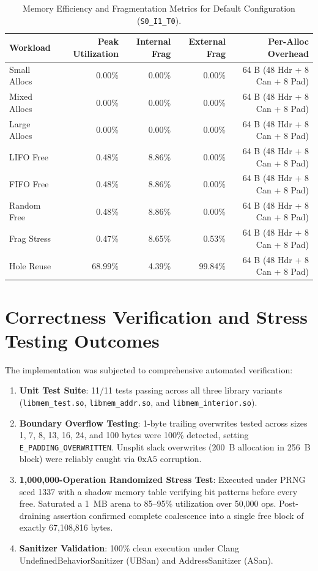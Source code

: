 \documentclass[a4paper,11pt]{report}
\begin{document}
\begin{table}[htbp]
\centering
\caption{Memory Efficiency and Fragmentation Metrics for Default Configuration (\texttt{S0\_I1\_T0}).}
\label{tab:efficiency}
\begin{tabular}{lrrrr}
\toprule
\textbf{Workload} & \textbf{Peak Utilization} & \textbf{Internal Frag} & \textbf{External Frag} & \textbf{Per-Alloc Overhead} \\
\midrule
Small Allocs    & 0.00\%  & 0.00\% & 0.00\%  & 64 B (48 Hdr + 8 Can + 8 Pad) \\
Mixed Allocs    & 0.00\%  & 0.00\% & 0.00\%  & 64 B (48 Hdr + 8 Can + 8 Pad) \\
Large Allocs    & 0.00\%  & 0.00\% & 0.00\%  & 64 B (48 Hdr + 8 Can + 8 Pad) \\
LIFO Free       & 0.48\%  & 8.86\% & 0.00\%  & 64 B (48 Hdr + 8 Can + 8 Pad) \\
FIFO Free       & 0.48\%  & 8.86\% & 0.00\%  & 64 B (48 Hdr + 8 Can + 8 Pad) \\
Random Free     & 0.48\%  & 8.86\% & 0.00\%  & 64 B (48 Hdr + 8 Can + 8 Pad) \\
Frag Stress     & 0.47\%  & 8.65\% & 0.53\%  & 64 B (48 Hdr + 8 Can + 8 Pad) \\
Hole Reuse      & 68.99\% & 4.39\% & 99.84\% & 64 B (48 Hdr + 8 Can + 8 Pad) \\
\bottomrule
\end{tabular}
\end{table}

\section{Correctness Verification and Stress Testing Outcomes}
The implementation was subjected to comprehensive automated verification:
\begin{enumerate}
    \item \textbf{Unit Test Suite}: 11/11 tests passing across all three library variants (\texttt{libmem\_test.so}, \texttt{libmem\_addr.so}, and \texttt{libmem\_interior.so}).
    \item \textbf{Boundary Overflow Testing}: 1-byte trailing overwrites tested across sizes 1, 7, 8, 13, 16, 24, and 100 bytes were 100\% detected, setting \texttt{E\_PADDING\_OVERWRITTEN}. Unsplit slack overwrites (200~B allocation in 256~B block) were reliably caught via $0\text{xA5}$ corruption.
    \item \textbf{1,000,000-Operation Randomized Stress Test}: Executed under PRNG seed 1337 with a shadow memory table verifying bit patterns before every free. Saturated a 1~MB arena to 85--95\% utilization over 50,000 ops. Post-draining assertion confirmed complete coalescence into a single free block of exactly 67,108,816 bytes.
    \item \textbf{Sanitizer Validation}: 100\% clean execution under Clang UndefinedBehaviorSanitizer (UBSan) and AddressSanitizer (ASan).
\end{enumerate}
\end{document}
